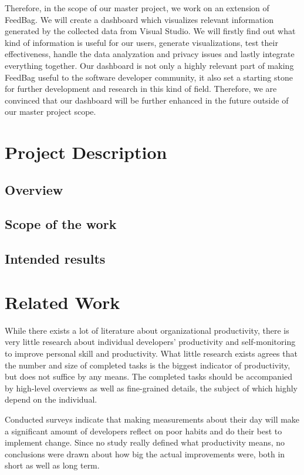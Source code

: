 \documentclass{seal_article}
\begin{document}
Therefore, in the scope of our master project, we work on an extension of FeedBag. We will create a dashboard which visualizes relevant information generated by the collected data from Visual Studio. We will firstly find out what kind of information is useful for our users, generate visualizations, test their effectiveness, handle the data analyzation and privacy issues and lastly integrate everything together. Our dashboard is not only a highly relevant part of making FeedBag useful to the software developer community, it also set a starting stone for further development and research in this kind of field. Therefore, we are convinced that our dashboard will be further enhanced in the future outside of our master project scope.

\section{Project Description}

\subsection{Overview}
\subsection{Scope of the work}
\subsection{Intended results}

\section{Related Work}
While there exists a lot of literature about organizational productivity, there is very little research about individual developers’ productivity and self-monitoring to improve personal skill and productivity. What little research exists ​\cite{Meyer:2014:SDP:2635868.2635892, Meyer:2017:DRS:3171581.3134714} agrees that the number and size of completed tasks is the biggest indicator of productivity, but does not suffice by any means. The completed tasks should be accompanied by high-level overviews as well as fine-grained details, the subject of which highly depend on the individual.

Conducted surveys ​\cite{Meyer:2014:SDP:2635868.2635892, Meyer:2017:DRS:3171581.3134714} indicate that making measurements about their day will make a significant amount of developers reflect on poor habits and do their best to implement change. Since no study really defined what productivity means, no conclusions were drawn about how big the actual improvements were, both in short as well as long term.
\end{document}
